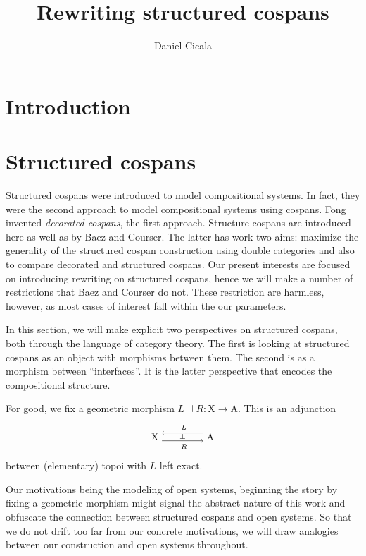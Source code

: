 \documentclass{amsart}
\author{Daniel Cicala}
\title{Rewriting structured cospans}
\newcommand{\A}{\cat{A}}
\newcommand{\X}{\cat{X}}
\newcommand{\cat}[1]{\mathrm{#1}}
\newcommand{\from}{\colon}
\theoremstyle{remark}
\theoremstyle{definition}
\newcommand{\adjunction}[4]{%
  \begin{tikzpicture}[baseline=-3pt]
    \node (1) at (0,0) {\( #1 \)};
    \node (2) at (2,0) {\( #4 \)};
    \draw [->]
      ([yshift= 4pt]2.west) to
      node [above] {\scriptsize{ $ #2 $ }}
      ([yshift= 4pt]1.east);
    \draw [->]
      ([yshift= -4pt]1.east) to
      node [below] {\scriptsize{ $ #3 $ }}
      node [above,yshift= -1.5pt] {\scriptsize{$ \perp $}}
      ([yshift= -4pt]2.west);
  \end{tikzpicture}
%
}
\begin{document}
\maketitle{}



\section{Introduction}
\label{sec:intro}

\section{Structured cospans}
\label{sec:cat-of-strcsp}

Structured cospans were introduced to model compositional systems. In
fact, they were the second approach to model compositional systems
using cospans. Fong invented \emph{decorated cospans},
%
%
the first approach.  Structure cospans are
introduced here as well as by Baez and Courser.
%
%
The latter has work two aims: maximize the
generality of the structured cospan construction using double
categories and also to compare decorated and structured cospans. Our
present interests are focused on introducing rewriting on structured
cospans, hence we will make a number of restrictions that Baez and
Courser do not.  These restriction are harmless, however, as most
cases of interest fall within the our parameters.

In this section, we will make explicit two perspectives on structured
cospans, both through the language of category theory.  The first is
looking at structured cospans as an object with morphisms between
them. The second is as a morphism between ``interfaces''.  It is the
latter perspective that encodes the compositional structure.  


For good, we fix a geometric morphism $ L \dashv R \from \X \to \A
$. This is an adjunction
%
\[
  \adjunction{\X}{L}{R}{\A}
\]
%
between (elementary) topoi with $ L $ left exact.

Our motivations being the modeling of open systems, beginning
the story by fixing a geometric morphism might signal the abstract
nature of this work and obfuscate the connection between structured
cospans and open systems. So that we do not drift too far from our
concrete motivations, we will draw analogies between our construction
and open systems throughout.  
\end{document}

